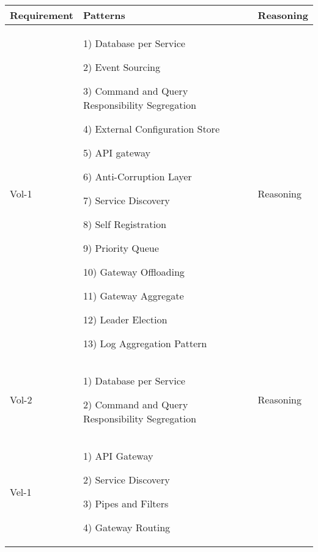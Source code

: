 \documentclass[conference]{IEEEtran}
\begin{document}
\begin{center}
    \begin{table*}
    \renewcommand*{\arraystretch}{1.8}
    \begin{tabular}{ | m{2cm} | m{8cm} |  m{2cm} |}

        \hline

        Requirement &  Patterns & Reasoning
 
        \\
        \hline

        Vol-1 &  
        
        1) Database per Service

        2)  Event Sourcing
        
        3)  Command and Query Responsibility Segregation
        
        4)  External Configuration Store
        
        5)  API gateway
        
        6)  Anti-Corruption Layer
        
        7)  Service Discovery
        
        8)  Self Registration
        
        9)  Priority Queue

        10) Gateway Offloading 

        11) Gateway Aggregate 

        12) Leader Election

        13) Log Aggregation Pattern 
        
        & Reasoning 
 
        \\

        \hline

        Vol-2 &  
        
        1) Database per Service  
        
        2) Command and Query Responsibility Segregation
        
        & Reasoning
        
        \\
        \hline

        Vel-1 &  
    
        1) API Gateway 

        2) Service Discovery 

        3) Pipes and Filters 

        4) Gateway Routing 


\end{tabular}
\end{table*}
\end{center}
\end{document}
